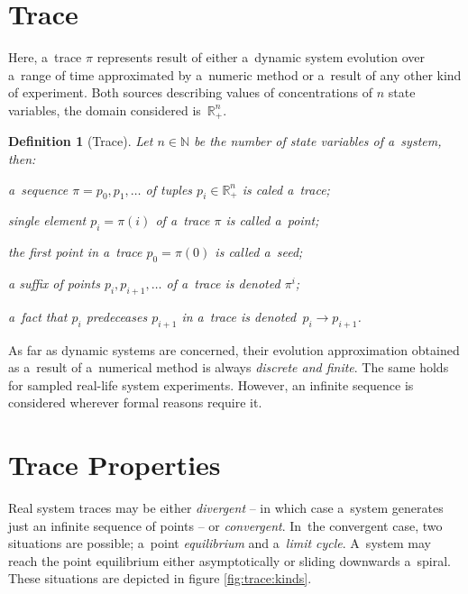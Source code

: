 \documentclass[12pt,oneside,draft]{fithesis}
\newcommand{\mReal}{\mathbb{R}}
\newcommand{\mNatural}{\mathbb{N}}
\newtheorem{mydef}{Definition}
\begin{document}
\section{Trace}
Here, a~trace $\pi$ represents result of either a~dynamic system
evolution over a~range of time\cite{sven}\cite{pospisil} approximated by
a~numeric method or a~result of any other kind of experiment.
Both sources describing values of concentrations of $n$ state variables,
the domain considered is~$\mReal_{+}^n$.

\begin{mydef}[Trace]
Let $n\in\mNatural$ be the number of state variables of a~system,
then:
\begin{inparaenum}
\item a~sequence $\pi=p_0,p_1,\dotsc$ of tuples
$p_i\in\mReal_{+}^n$ is caled a~trace;
\item single element $p_i=\pi(i)$ of a~trace $\pi$ is
called a~point;
\item the first point in a~trace $p_0=\pi(0)$ is called
a~seed;
\item a suffix of points $p_i,p_{i+1},\dotsc$ of a~trace is
denoted $\pi^i$;
\item a~fact that $p_i$ predeceases $p_{i+1}$ in a~trace is
denoted~$p_i\rightarrow p_{i+1}$.
\end{inparaenum}
\end{mydef}

As far as dynamic systems are concerned, their evolution approximation
obtained as a~result of a~numerical method is always \emph{discrete and
finite}. The same holds for sampled real-life system experiments.
However, an infinite sequence is considered wherever formal reasons
require it.

\section{Trace Properties}
Real system traces may be either \emph{divergent} -- in which case
a~system generates just an infinite sequence of points -- or
\emph{convergent}. In~the convergent case, two situations are possible;
a~point \emph{equilibrium} and a~\emph{limit cycle}. A~system may reach
the point equilibrium either asymptotically or sliding downwards
a~spiral. These situations are depicted in figure \ref{fig:trace:kinds}.
\end{document}
